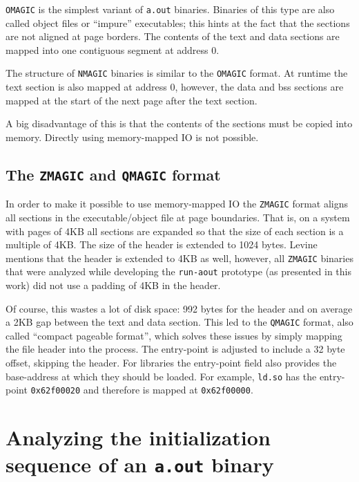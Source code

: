 \documentclass[draft,final]{vutinfth} %
\begin{document}
\texttt{OMAGIC} is the simplest variant of \texttt{a.out} binaries. Binaries of this type are also called object files or ``impure'' executables; this hints at the fact that the sections are not aligned at page borders. The contents of the text and data sections are mapped into one contiguous segment at address 0.

The structure of \texttt{NMAGIC} binaries is similar to the \texttt{OMAGIC} format. At runtime the text section is also mapped at address 0, however, the data and bss sections are mapped at the start of the next page after the text section.

A big disadvantage of this is that the contents of the sections must be copied into memory. Directly using memory-mapped IO is not possible.

\subsection{The \texttt{ZMAGIC} and \texttt{QMAGIC} format}
\label{formatdesc_zqmagic}

In order to make it possible to use memory-mapped IO the \texttt{ZMAGIC} format aligns all sections in the executable/object file at page boundaries.\cite[page 53]{Levine} That is, on a system with pages of 4KB all sections are expanded so that the size of each section is a multiple of 4KB. The size of the header is extended to 1024 bytes. Levine\cite[page 53]{Levine} mentions that the header is extended to 4KB as well, however, all \texttt{ZMAGIC} binaries that were analyzed while developing the \texttt{run-aout} prototype (as presented in this work) did not use a padding of 4KB in the header.

Of course, this wastes a lot of disk space: 992 bytes for the header and on average a 2KB gap between the text and data section. This led to the \texttt{QMAGIC} format, also called ``compact pageable format''\cite[page 53]{Levine}, which solves these issues by simply mapping the file header into the process. The entry-point is adjusted to include a 32 byte offset, skipping the header. For libraries the entry-point field also provides the base-address at which they should be loaded. For example, \texttt{ld.so} has the entry-point \texttt{0x62f00020} and therefore is mapped at \texttt{0x62f00000}.

\section{Analyzing the initialization sequence of an \texttt{a.out} binary}
\end{document}
